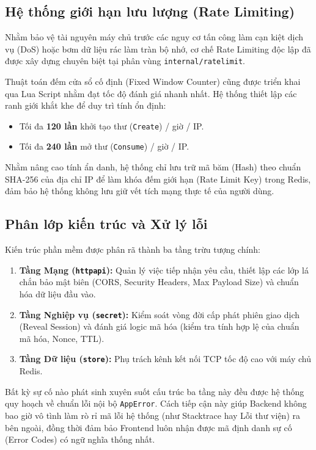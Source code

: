 \subsection{Hệ thống giới hạn lưu lượng (Rate Limiting)}

Nhằm bảo vệ tài nguyên máy chủ trước các nguy cơ tấn công làm cạn kiệt dịch vụ (DoS) hoặc bơm dữ liệu rác làm tràn bộ nhớ, cơ chế Rate Limiting độc lập đã được xây dựng chuyên biệt tại phân vùng \texttt{internal/ratelimit}.

Thuật toán đếm cửa sổ cố định (Fixed Window Counter) cũng được triển khai qua Lua Script nhằm đạt tốc độ đánh giá nhanh nhất. Hệ thống thiết lập các ranh giới khắt khe để duy trì tính ổn định:
\begin{itemize}
    \item Tối đa \textbf{120 lần} khởi tạo thư (\texttt{Create}) / giờ / IP.
    \item Tối đa \textbf{240 lần} mở thư (\texttt{Consume}) / giờ / IP.
\end{itemize}

Nhằm nâng cao tính ẩn danh, hệ thống chỉ lưu trữ mã băm (Hash) theo chuẩn SHA-256 của địa chỉ IP để làm khóa đếm giới hạn (Rate Limit Key) trong Redis, đảm bảo hệ thống không lưu giữ vết tích mạng thực tế của người dùng.

\subsection{Phân lớp kiến trúc và Xử lý lỗi}

Kiến trúc phần mềm được phân rã thành ba tầng trừu tượng chính:
\begin{enumerate}
    \item \textbf{Tầng Mạng (\texttt{httpapi}):} Quản lý việc tiếp nhận yêu cầu, thiết lập các lớp lá chắn bảo mật biên (CORS, Security Headers, Max Payload Size) và chuẩn hóa dữ liệu đầu vào.
    \item \textbf{Tầng Nghiệp vụ (\texttt{secret}):} Kiểm soát vòng đời cấp phát phiên giao dịch (Reveal Session) và đánh giá logic mã hóa (kiểm tra tính hợp lệ của chuẩn mã hóa, Nonce, TTL).
    \item \textbf{Tầng Dữ liệu (\texttt{store}):} Phụ trách kênh kết nối TCP tốc độ cao với máy chủ Redis.
\end{enumerate}

Bất kỳ sự cố nào phát sinh xuyên suốt cấu trúc ba tầng này đều được hệ thống quy hoạch về chuẩn lỗi nội bộ \texttt{AppError}. Cách tiếp cận này giúp Backend không bao giờ vô tình làm rò rỉ mã lỗi hệ thống (như Stacktrace hay Lỗi thư viện) ra bên ngoài, đồng thời đảm bảo Frontend luôn nhận được mã định danh sự cố (Error Codes) có ngữ nghĩa thống nhất.